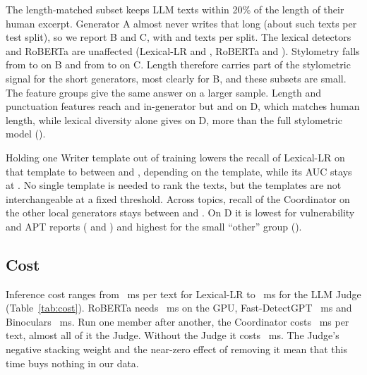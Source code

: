\documentclass[journal]{IEEEtran}
\begin{document}
The length-matched subset keeps LLM texts within 20\% of the length of their human excerpt. Generator A almost
never writes that long (about \LenAN{} such texts per test split), so we report B and C, with \LenBN{} and
\LenCN{} texts per split. The lexical detectors and RoBERTa are unaffected (Lexical-LR \LenBLexLR{} and
\LenCLexLR{}, RoBERTa \LenBTrans{} and \LenCTrans{}). Stylometry falls from \SameBStylo{} to \LenBStylo{} on B and
from \SameCStylo{} to \LenCStylo{} on C. Length therefore carries part of the stylometric signal for the short
generators, most clearly for B, and these subsets are small. The feature groups give the same answer on a larger
sample. Length and punctuation features reach \AblGroupLengthIn{} and \AblGroupPunctuationIn{} in-generator but
\AblGroupLengthD{} and \AblGroupPunctuationD{} on D, which matches human length, while lexical diversity alone gives
\AblGroupLexicalD{} on D, more than the full stylometric model (\AblStylometryD{}).

Holding one Writer template out of training lowers the recall of Lexical-LR on that template to between
\TplRecallMin{} and \TplRecallMax{}, depending on the template, while its AUC stays at \TplAucMin{}. No single
template is needed to rank the texts, but the templates are not interchangeable at a fixed threshold. Across
topics, recall of the Coordinator on the other local generators stays between \TopicCrossMin{} and
\TopicCrossMax{}. On D it is lowest for vulnerability and APT reports (\TopicDVulnerability{} and \TopicDApt{}) and
highest for the small ``other'' group (\TopicDOther{}).


\subsection{Cost}
Inference cost ranges from \MsLexLR{}~ms per text for Lexical-LR to \MsJudge{}~ms for the LLM Judge
(Table~\ref{tab:cost}). RoBERTa needs \MsTrans{}~ms on the GPU, Fast-DetectGPT \MsFast{}~ms and Binoculars
\MsBino{}~ms. Run one member after another, the Coordinator costs \MsCoord{}~ms per text, almost all of it the
Judge. Without the Judge it costs \MsCoordNoJudge{}~ms. The Judge's negative stacking weight and the near-zero
effect of removing it mean that this time buys nothing in our data.





\end{document}
